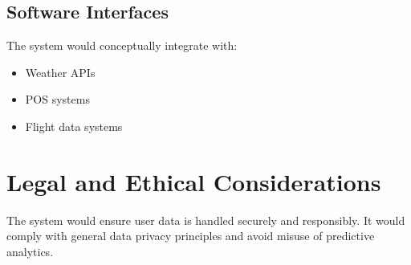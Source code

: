\documentclass[12pt]{report}
\begin{document}
\subsection{Software Interfaces}
The system would conceptually integrate with:
\begin{itemize}
    \item Weather APIs
    \item POS systems
    \item Flight data systems
\end{itemize}


\section{Legal and Ethical Considerations}

The system would ensure user data is handled securely and responsibly. It would comply with general data privacy principles and avoid misuse of predictive analytics.
\end{document}
